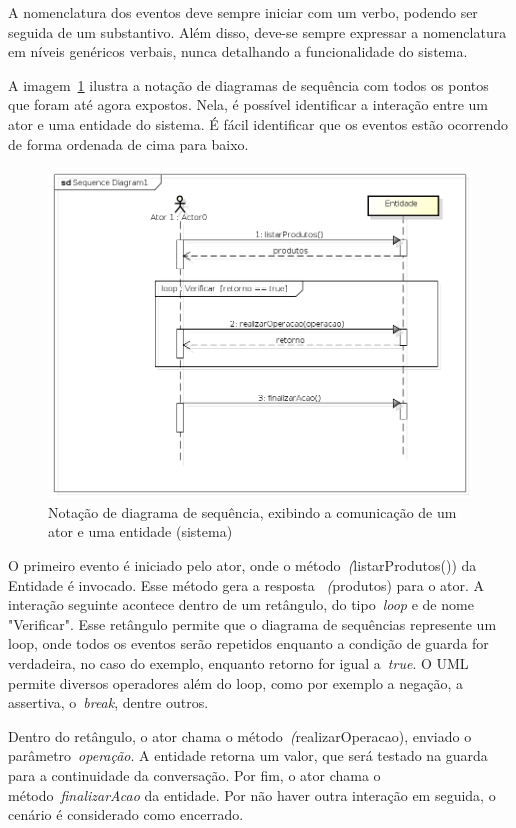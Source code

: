 A nomenclatura dos eventos deve sempre iniciar com um verbo, podendo ser seguida de um substantivo. Além disso, deve-se sempre expressar a nomenclatura em níveis genéricos verbais, nunca detalhando a funcionalidade do sistema.

A imagem~\ref{fig:exemplo-diagrama-sequencia} ilustra a notação de diagramas de sequência com todos os pontos que foram até agora expostos. Nela, é possível identificar a interação entre um ator e uma entidade do sistema. É fácil identificar que os eventos estão ocorrendo de forma ordenada de cima para baixo.
\begin{figure}
	\centering
	\includegraphics[scale=0.75]{images/exemplo-diagrama-sequencia.png}
	\caption{Notação de diagrama de sequência, exibindo a comunicação de um ator e uma entidade (sistema)}
	\label{fig:exemplo-diagrama-sequencia}
\end{figure}

O primeiro evento é iniciado pelo ator, onde o método~\emph(listarProdutos()) da Entidade é invocado. Esse método gera a resposta ~\emph(produtos) para o ator. A interação seguinte acontece dentro de um retângulo, do tipo~\emph{loop} e de nome "Verificar". Esse retângulo permite que o diagrama de sequências represente um loop, onde todos os eventos serão repetidos enquanto a condição de guarda for verdadeira, no caso do exemplo, enquanto retorno for igual a~\emph{true}. O UML permite diversos operadores além do loop, como por exemplo a negação, a assertiva, o~\emph{break}, dentre outros.

Dentro do retângulo, o ator chama o método~\emph(realizarOperacao), enviado o parâmetro~\emph{operação}. A entidade retorna um valor, que será testado na guarda para a continuidade da conversação. Por fim, o ator chama o método~\emph{finalizarAcao} da entidade. Por não haver outra interação em seguida, o cenário é considerado como encerrado. 

